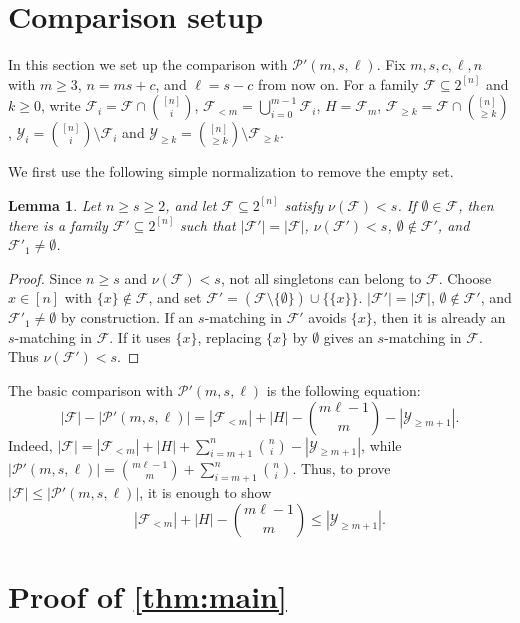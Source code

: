\documentclass[10pt,a4paper]{article}
\numberwithin{equation}{section}
\newtheorem{lemma}[lemma]{Lemma}
\theoremstyle{definition}
\newcommand{\F}{\mathcal F}
\newcommand{\Y}{\mathcal Y}
\begin{document}
\section{Comparison setup}\label{sec:comparison}

In this section we set up the comparison with
$\mathcal P'(m,s,\ell)$.
Fix $m,s,c,\ell,n$ with $m\ge3$, $n=ms+c$, and $\ell=s-c$ from now on.
For a family $\F\subseteq2^{[n]}$ and $k\ge0$, write $\F_i=\F\cap\binom{[n]}i$, $\F_{<m}=\bigcup_{i=0}^{m-1}\F_i$, $H=\F_m$, $\F_{\ge k}=\F\cap\binom{[n]}{\ge k}$, $\Y_i=\binom{[n]}i\setminus\F_i$ and $\Y_{\ge k}=\binom{[n]}{\ge k}\setminus\F_{\ge k}$.

We first use the following simple normalization to remove the empty set.
\begin{lemma}\label{lem:empty-reduction}
        Let $n\ge s\ge2$, and let $\F\subseteq2^{[n]}$ satisfy $\nu(\F)<s$.
        If $\emptyset\in\F$, then there is a family $\F'\subseteq2^{[n]}$ such that $|\F'|=|\F|$, $\nu(\F')<s$, $\emptyset\notin\F'$, and $\F'_1\ne\emptyset$.
\end{lemma}

\begin{proof}
        Since $n\ge s$ and $\nu(\F)<s$, not all singletons can belong to $\F$.
        Choose $x\in[n]$ with $\{x\}\notin\F$, and set $\F'=(\F\setminus\{\emptyset\})\cup\{\{x\}\}$.
        $|\F'|=|\F|$, $\emptyset\notin\F'$, and $\F'_1\ne\emptyset$ by construction.
        If an $s$-matching in $\F'$ avoids $\{x\}$, then it is already an $s$-matching in $\F$.
        If it uses $\{x\}$, replacing $\{x\}$ by $\emptyset$ gives an $s$-matching in $\F$.
        Thus $\nu(\F')<s$.
\end{proof}


The basic comparison with $\mathcal P'(m,s,\ell)$ is the following equation:
\begin{equation}\label{eq:layer-balance}
        |\F|-|\mathcal P'(m,s,\ell)|
        =
        |\F_{<m}|+|H|-\binom{m\ell-1}{m}
        -|\Y_{\ge m+1}|.
\end{equation}
Indeed, $|\F|
        =
        |\F_{<m}|+|H|+
        \sum_{i=m+1}^{n}\binom ni
        -|\Y_{\ge m+1}|$, while $|\mathcal P'(m,s,\ell)|
        =
        \binom{m\ell-1}{m}+
        \sum_{i=m+1}^{n}\binom ni$.
Thus, to prove $|\F|\le |\mathcal P'(m,s,\ell)|$, it is enough to show
\[
        |\F_{<m}|+|H|-\binom{m\ell-1}{m}
        \le |\Y_{\ge m+1}|.
\]


\section{Proof of \cref{thm:main}}
\label{sec:general-proof}
\end{document}
